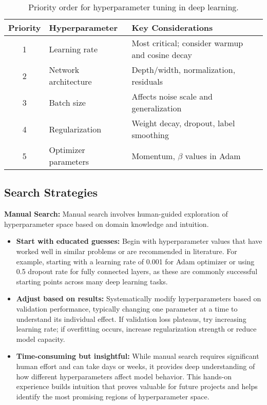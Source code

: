 \begin{table}[h]
\centering
\begin{tabular}{|c|p{}|p{}|}
\hline
\textbf{Priority} & \textbf{Hyperparameter} & \textbf{Key Considerations} \\
\hline
1 & Learning rate & Most critical; consider warmup and cosine decay \\
\hline
2 & Network architecture & Depth/width, normalization, residuals \\
\hline
3 & Batch size & Affects noise scale and generalization \\
\hline
4 & Regularization & Weight decay, dropout, label smoothing \\
\hline
5 & Optimizer parameters & Momentum, $\beta$ values in Adam \\
\hline
\end{tabular}
\caption{Priority order for hyperparameter tuning in deep learning.}
\label{tab:hyperparameter-priority}
\end{table}

\subsection{Search Strategies}

\textbf{Manual Search:} Manual search involves human-guided exploration of hyperparameter space based on domain knowledge and intuition. 
\begin{itemize}
    \item \textbf{Start with educated guesses:} Begin with hyperparameter values that have worked well in similar problems or are recommended in literature. For example, starting with a learning rate of 0.001 for Adam optimizer or using 0.5 dropout rate for fully connected layers, as these are commonly successful starting points across many deep learning tasks.
    
    \item \textbf{Adjust based on results:} Systematically modify hyperparameters based on validation performance, typically changing one parameter at a time to understand its individual effect. If validation loss plateaus, try increasing learning rate; if overfitting occurs, increase regularization strength or reduce model capacity.
    
    \item \textbf{Time-consuming but insightful:} While manual search requires significant human effort and can take days or weeks, it provides deep understanding of how different hyperparameters affect model behavior. This hands-on experience builds intuition that proves valuable for future projects and helps identify the most promising regions of hyperparameter space.
\end{itemize}

